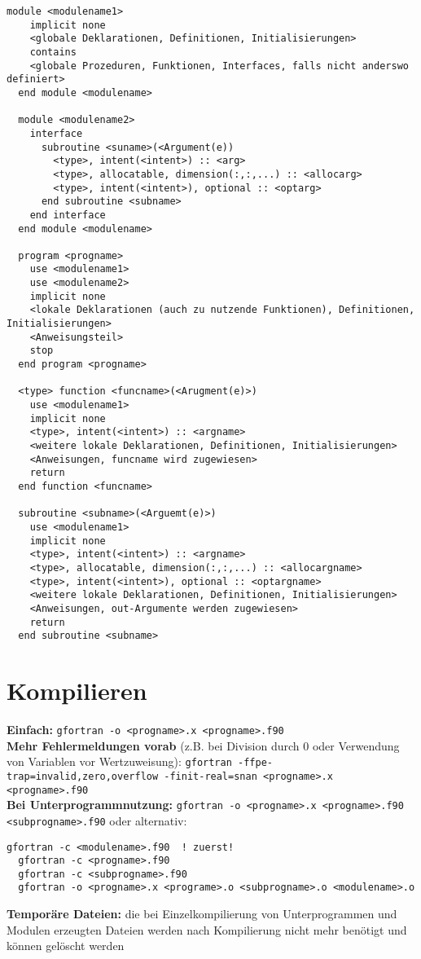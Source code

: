 \documentclass[a4paper, twocolumn]{scrarticle}
\begin{document}
\begin{lstlisting}[caption={\bfseries Dateischema Modul, Haupt- und Unterprogramme },label=code:structure]
  module <modulename1>
    implicit none
    <globale Deklarationen, Definitionen, Initialisierungen>
    contains
    <globale Prozeduren, Funktionen, Interfaces, falls nicht anderswo definiert>
  end module <modulename>
  
  module <modulename2>
    interface
      subroutine <suname>(<Argument(e))
        <type>, intent(<intent>) :: <arg>
        <type>, allocatable, dimension(:,:,...) :: <allocarg>
        <type>, intent(<intent>), optional :: <optarg>
      end subroutine <subname>
    end interface
  end module <modulename>
  
  program <progname>
    use <modulename1>
    use <modulename2>
    implicit none
    <lokale Deklarationen (auch zu nutzende Funktionen), Definitionen, Initialisierungen>
    <Anweisungsteil>
    stop
  end program <progname>
  
  <type> function <funcname>(<Arugment(e)>)
    use <modulename1>
    implicit none
    <type>, intent(<intent>) :: <argname>
    <weitere lokale Deklarationen, Definitionen, Initialisierungen>
    <Anweisungen, funcname wird zugewiesen>
    return
  end function <funcname>
  
  subroutine <subname>(<Arguemt(e)>)
    use <modulename1>
    implicit none
    <type>, intent(<intent>) :: <argname>
    <type>, allocatable, dimension(:,:,...) :: <allocargname>
    <type>, intent(<intent>), optional :: <optargname>
    <weitere lokale Deklarationen, Definitionen, Initialisierungen>
    <Anweisungen, out-Argumente werden zugewiesen>
    return
  end subroutine <subname>
\end{lstlisting}

\section{Kompilieren}
\textbf{Einfach:} \lstinline[style=neutral]|gfortran -o <progname>.x <progname>.f90| \\
\textbf{Mehr Fehlermeldungen vorab} (z.B. bei Division durch 0 oder Verwendung von Variablen vor Wertzuweisung): \lstinline[style=neutral]|gfortran -ffpe-trap=invalid,zero,overflow -finit-real=snan <progname>.x <progname>.f90|\\
\textbf{Bei Unterprogrammnutzung:} \lstinline[style=neutral]|gfortran -o <progname>.x <progname>.f90 <subprogname>.f90| oder alternativ:
\begin{lstlisting}[style=neutral,caption={\textbf{Kompilieren von Haupt- und Unterprogrammenn}}]
  gfortran -c <modulename>.f90  ! zuerst!
  gfortran -c <progname>.f90 
  gfortran -c <subprogname>.f90 
  gfortran -o <progname>.x <programe>.o <subprogname>.o <modulename>.o
\end{lstlisting}
\textbf{Temporäre Dateien:} die bei Einzelkompilierung von Unterprogrammen und Modulen erzeugten Dateien werden nach Kompilierung nicht mehr benötigt und können gelöscht werden
\end{document}
